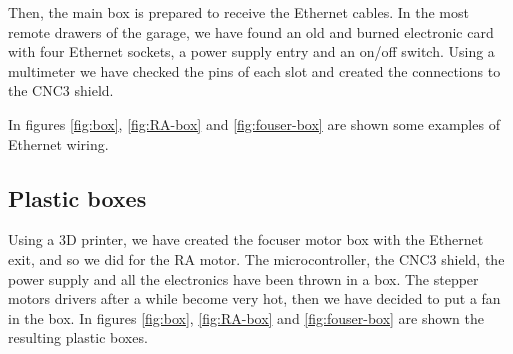 \documentclass{article}
\begin{document}
\begin{multicols}{2}
        Then, the main box is prepared to receive the Ethernet cables.
        In the most remote drawers of the garage, we have found an old and burned electronic card with four Ethernet sockets, a power supply entry and an on/off switch.
        Using a multimeter we have checked the pins of each slot and created the connections to the CNC3 shield.

        In figures \ref{fig:box}, \ref{fig:RA-box} and \ref{fig:fouser-box} are shown some examples of Ethernet wiring.

        \subsection{Plastic boxes}
        Using a 3D printer, we have created the focuser motor box with the Ethernet exit, and so we did for the RA motor.
        The microcontroller, the CNC3 shield, the power supply and all the electronics have been thrown in a box.
        The stepper motors drivers after a while become very hot, then we have decided to put a fan in the box.
        In figures \ref{fig:box}, \ref{fig:RA-box} and \ref{fig:fouser-box} are shown the resulting plastic boxes.


\end{multicols}
\end{document}
